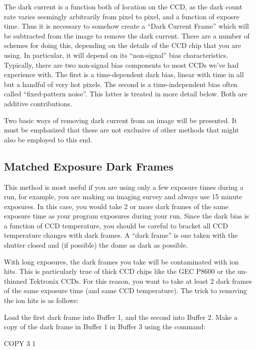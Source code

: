 The dark current is a function both of location on the CCD, as the dark count
rate varies seemingly arbitrarily from pixel to pixel, and a function of
exposre time.  Thus it is necessary to somehow create a ``Dark Current Frame''
which will be subtracted from the image to remove the dark current.  There are a
number of schemes for doing this, depending on the details of the CCD chip
that you are using.  In particular, it will depend on its ``non-signal'' bias
characteristics.  Typically, there are two non-signal bias components to most
CCDs we've had experience with.  The first is a time-dependent dark bias,
linear with time in all but a handful of very hot pixels.  The second is a
time-independent bias often called ``fixed-pattern noise''.  This latter is
treated in more detail below.  Both are additive contributions. 

Two basic ways of removing dark current from an image will be presented.  It must
be emphasized that these are not exclusive of other methods that might also be
employed to this end. 

\subsection{Matched Exposure Dark Frames}
\nobreak
This method is most useful if you are using only a few exposure times during a
run, for example, you are making an imaging survey and always use 15 minute
exposures.  In this case, you would take 2 or more dark frames of the same
exposure time as your program exposures during your run.  Since the dark bias
is a function of CCD temperature, you should be careful to bracket all CCD
temperature changes with dark frames.  A ``dark frame'' is one taken with the
shutter closed and (if possible) the dome as dark as possible. 

With long exposures, the dark frames you take will be contaminated with ion
hits.  This is particularly true of thick CCD chips like the GEC P8600 or the
un-thinned Tektronix CCDs.  For this reason, you want to take at least 2 dark
frames of the same exposure time (and same CCD temperature).  The trick to
removing the ion hits is as follows: 

Load the first dark frame into Buffer 1, and the second into Buffer 2. Make a
copy of the dark frame in Buffer 1 in Buffer 3 using the command: 

\begin{command}
      \item COPY 3 1
\end{command}

